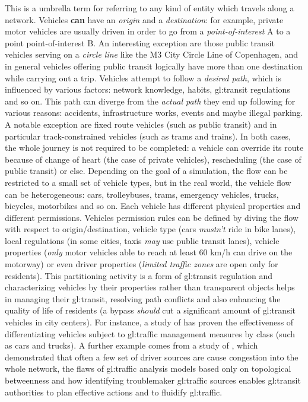 This is a umbrella term for referring to any kind of entity which travels along a network.
Vehicles \textbf{can} have an \textit{origin} and a \textit{destination}: for example, private motor vehicles are usually driven in order to go from a \textit{point-of-interest} A to a point point-of-interest B.
An interesting exception are those public transit vehicles serving on a \textit{circle line} like the M3 City Circle Line of Copenhagen, and in general vehicles offering public transit logically have more than one destination while carrying out a trip.
Vehicles attempt to follow a \textit{desired path}, which is influenced by various factors: network knowledge, habits, \gls{gl:transit} regulations and so on.
This path can diverge from the \textit{actual path} they end up following for various reasons: accidents, infrastructure works, events and maybe illegal parking.
A notable exception are fixed route vehicles (such as public transit) and in particular track-constrained vehicles (such as trams and trains).
In both cases, the whole journey is not required to be completed: a vehicle can override its route because of change of heart (the case of private vehicles), rescheduling (the case of public transit) or else.
Depending on the goal of a simulation, the flow can be restricted to a small set of vehicle types, but in the real world, the vehicle flow can be heterogeneous: cars, trolleybuses, trams, emergency vehicles, trucks, bicycles, motorbikes and so on. Each vehicle has different physical properties and different permissions.
Vehicles permission rules can be defined by diving the flow with respect to origin/destination, vehicle type (cars \textit{mustn't} ride in bike lanes), local regulations (in some cities, taxis \textit{may} use public transit lanes), vehicle properties (\textit{only} motor vehicles able to reach at least 60 km/h can drive on the motorway) or even driver properties (\textit{limited traffic zones} are open only for residents).
This partitioning activity is a form of \gls{gl:transit} regulation and characterizing vehicles by their properties rather than transparent objects helps in managing their \gls{gl:transit}, resolving path conflicts and also enhancing the quality of life of residents (a bypass \textit{should} cut a significant amount of \gls{gl:transit} vehicles in city centers).
For instance, a study of \citeauthor{schreiter2013vehicle} \cite{schreiter2013vehicle} has proven the effectiveness of differentiating vehicles subject to \gls{gl:traffic} management measures by class (such as cars and trucks).
A further example comes from a study of \citeauthor{wang2012understanding} \cite{wang2012understanding}, which demonstrated that often a few set of driver sources are cause congestion into the whole network, the flaws of \gls{gl:traffic} analysis models based only on topological betweenness and how identifying troublemaker \gls{gl:traffic} sources enables \gls{gl:transit} authorities to plan effective actions and to fluidify \gls{gl:traffic}.

